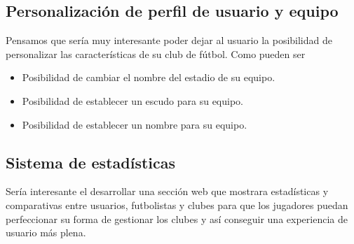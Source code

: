 \subsection{Personalización de perfil de usuario y equipo}
Pensamos que sería muy interesante poder dejar al usuario la posibilidad de
personalizar las características de su club de fútbol. Como pueden ser

\begin{itemize}
\item Posibilidad de cambiar el nombre del estadio de su equipo.
\item Posibilidad de establecer un escudo para su equipo.
\item Posibilidad de establecer un nombre para su equipo.
\end{itemize}

\subsection{Sistema de estadísticas}
Sería interesante el desarrollar una sección web que mostrara estadísticas y
comparativas entre usuarios, futbolistas y clubes para que los jugadores puedan
perfeccionar su forma de gestionar los clubes y así conseguir una experiencia de
usuario más plena.
